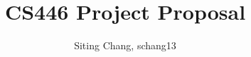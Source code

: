 \documentclass[conference]{IEEEtran}
\numberwithin{figure}{section}
\begin{document}
\title{CS446 Project Proposal}
\author{Siting Chang, schang13}

\maketitle
\makenomenclature



{}

\end{document}
